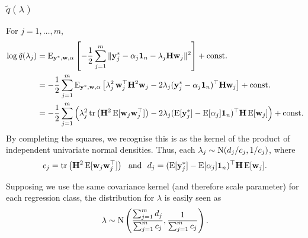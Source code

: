 
\subsubsection{$\tilde q(\lambda)$}

For $j = 1,\dots,m$,
\begin{align*}
  \log \tilde q(\lambda_j) 
  &= \operatorname{E}_{{\mathbf y}^*, {\mathbf w}, \alpha} \left[ 
  - \frac{1}{2} \sum_{j=1}^m \, \lVert{\mathbf y}_j^* - \alpha_j{\mathbf 1}_{n} - \lambda_j{\mathbf H}{\mathbf w}_j\rVert^2  
  \right] + \text{const.}\hspace{0.01em} \\
  &= - \frac{1}{2} \sum_{j=1}^m \operatorname{E}_{{\mathbf y}^*, {\mathbf w}, \alpha} \left[ 
  \lambda_j^2 \, {\mathbf w}_j^\top {\mathbf H}^2 {\mathbf w}_j 
  - 2\lambda_j ({\mathbf y}_j^* - \alpha_j{\mathbf 1}_{n})^\top {\mathbf H} {\mathbf w}_j \right] 
  + \text{const.}\hspace{0.01em} \\  
  &= - \frac{1}{2} \sum_{j=1}^m \Big( \lambda_j^2 \operatorname{tr} \left(  {\mathbf H}^2 \operatorname{E}[{\mathbf w}_j {\mathbf w}_j^\top] \right) - 2 \lambda_j (\operatorname{E}[{\mathbf y}_j^*] - \operatorname{E}[\alpha_j]{\mathbf 1}_{n})^\top {\mathbf H} \operatorname{E}[{\mathbf w}_j] \Big) + \text{const.}\hspace{0.01em}
\end{align*}
By completing the squares, we recognise this is as the kernel of the product of independent univariate normal densities. Thus, each $\lambda_j \sim \operatorname{N}(d_j/c_j, 1/c_j)$, where
\begin{gather*}
  c_j = \operatorname{tr} \left(  {\mathbf H}^2 \operatorname{E}[{\mathbf w}_j {\mathbf w}_j^\top] \right) 
  \ \text{ and } \
  d_j = (\operatorname{E}[{\mathbf y}_j^*] - \operatorname{E}[\alpha_j]{\mathbf 1}_{n})^\top {\mathbf H} \operatorname{E}[{\mathbf w}_j].
\end{gather*}

Supposing we use the same covariance kernel (and therefore scale parameter) for each regression class, the distribution for $\lambda$ is easily seen as
\[
  \lambda \sim \operatorname{N} \left( \frac{\sum_{j=1}^m d_j}{\sum_{j=1}^m c_j}, \frac{1}{\sum_{j=1}^m c_j} \right).
\]

